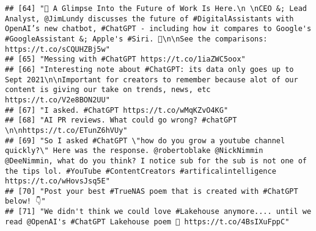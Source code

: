 \documentclass[
]{article}
\begin{document}
\begin{verbatim}
## [64] "👀 A Glimpse Into the Future of Work Is Here.\n \nCEO &; Lead Analyst, @JimLundy discusses the future of #DigitalAssistants with OpenAI’s new chatbot, #ChatGPT - including how it compares to Google's #GoogleAssistant &; Apple's #Siri. 🤖\n\nSee the comparisons: https://t.co/sCQUHZBj5w"                                  
## [65] "Messing with #ChatGPT https://t.co/1iaZWC5oox"                                                                                                                                                                                                                                                                                  
## [66] "Interesting note about #ChatGPT: its data only goes up to Sept 2021\n\nImportant for creators to remember because alot of our content is giving our take on trends, news, etc https://t.co/V2e8BON2UU"                                                                                                                          
## [67] "I asked. #ChatGPT https://t.co/wMqKZvO4KG"                                                                                                                                                                                                                                                                                      
## [68] "AI PR reviews. What could go wrong? #chatGPT \n\nhttps://t.co/ETunZ6hVUy"                                                                                                                                                                                                                                                       
## [69] "So I asked #ChatGPT \"how do you grow a youtube channel quickly?\" Here was the response. @robertoblake @NickNimmin @DeeNimmin, what do you think? I notice sub for the sub is not one of the tips lol. #YouTube #ContentCreators #artificalintelligence https://t.co/wHovsJsq5E"                                               
## [70] "Post your best #TrueNAS poem that is created with #ChatGPT below! 👇"                                                                                                                                                                                                                                                           
## [71] "We didn't think we could love #Lakehouse anymore.... until we read @OpenAI's #ChatGPT Lakehouse poem 🥺 https://t.co/4BsIXuFppC"                                                                                                                                                                                                

\end{verbatim}
\end{document}
